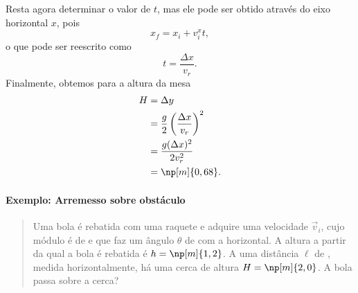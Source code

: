Resta agora determinar o valor de $t$, mas ele pode ser obtido através do eixo horizontal $x$, pois
\begin{equation}
	x_f = x_i + v_{i}^{x}t,
\end{equation}
%
o que pode ser reescrito como
\begin{equation}
	t = \frac{\Delta x}{v_r}.
\end{equation}
%
Finalmente, obtemos para a altura da mesa
\begin{align}
	H &= \Delta y \\
	  &= \frac{g}{2} \left(\frac{\Delta x}{v_r}\right)^2 \\
	  &= \frac{g (\Delta x)^2}{2 v_r^2} \\
	  &= \np[m]{0,68}.
\end{align}

\paragraph{Exemplo: Arremesso sobre obstáculo}

\begin{quote}
Uma bola é rebatida com uma raquete e adquire uma velocidade $\vec{v}_i$, cujo módulo é de  e que faz um ângulo $\theta$ de  com a horizontal. A altura a partir da qual a bola é rebatida é $h = \np[m]{1,2}$. A uma distância $\ell$ de , medida horizontalmente, há uma cerca de altura $H = \np[m]{2,0}$. A bola passa sobre a cerca?
\end{quote}


